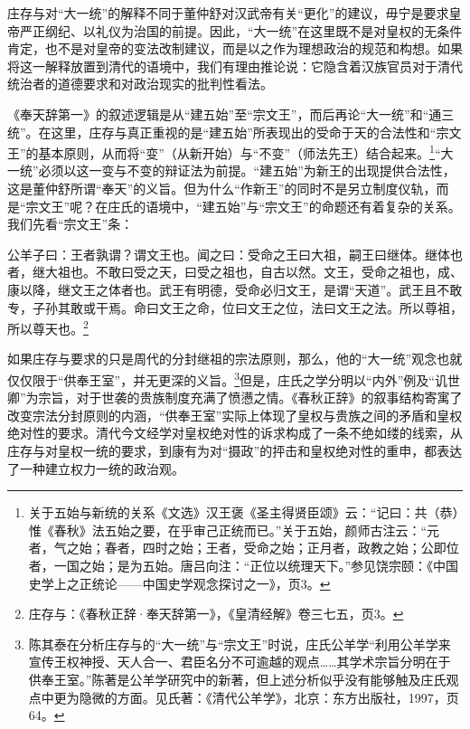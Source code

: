 \documentclass[a4paper, 12pt, openright]{ctexbook}
\renewenvironment{quote}
  {\list{}{\rightmargin2\ccwd \leftmargin2\ccwd \itemindent=2\ccwd \listparindent=2\ccwd}%
   \item\relax\small\kaishu\color{black}}
  {\endlist}
\begin{document}
庄存与对“大一统”的解释不同于董仲舒对汉武帝有关“更化”的建议，毋宁是要求皇帝严正纲纪、以礼仪为治国的前提。因此，“大一统”在这里既不是对皇权的无条件肯定，也不是对皇帝的变法改制建议，而是以之作为理想政治的规范和构想。如果将这一解释放置到清代的语境中，我们有理由推论说：它隐含着汉族官员对于清代统治者的道德要求和对政治现实的批判性看法。

《奉天辞第一》的叙述逻辑是从“建五始”至“宗文王”，而后再论“大一统”和“通三统”。在这里，庄存与真正重视的是“建五始”所表现出的受命于天的合法性和“宗文王”的基本原则，从而将“变”（从新开始）与“不变”（师法先王）结合起来。\footnote{关于五始与新统的关系《文选》汉王褒《圣主得贤臣颂》云：“记曰：共（恭）惟《春秋》法五始之要，在乎审己正统而已。”关于五始，颜师古注云：“元者，气之始；春者，四时之始；王者，受命之始；正月者，政教之始；公即位者，一国之始；是为五始。唐吕向注：“正位以统理天下。”参见饶宗颐：《中国史学上之正统论——中国史学观念探讨之一》，页3。}“大一统”必须以这一变与不变的辩证法为前提。“建五始”为新王的出现提供合法性，这是董仲舒所谓“奉天”的义旨。但为什么“作新王”的同时不是另立制度仪轨，而是“宗文王”呢？在庄氏的语境中，“建五始”与“宗文王”的命题还有着复杂的关系。我们先看“宗文王”条：

\begin{quote}
公羊子曰：王者孰谓？谓文王也。闻之曰：受命之王曰大祖，嗣王曰继体。继体也者，继大祖也。不敢曰受之天，曰受之祖也，自古以然。文王，受命之祖也，成、康以降，继文王之体者也。武王有明德，受命必归文王，是谓“天道”。武王且不敢专，子孙其敢或干焉。命曰文王之命，位曰文王之位，法曰文王之法。所以尊祖，所以尊天也。\footnote{庄存与：《春秋正辞·奉天辞第一》，《皇清经解》卷三七五，页3。}
\end{quote}

如果庄存与要求的只是周代的分封继祖的宗法原则，那么，他的“大一统”观念也就仅仅限于“供奉王室”，并无更深的义旨。\footnote{陈其泰在分析庄存与的“大一统”与“宗文王”时说，庄氏公羊学“利用公羊学来宣传王权神授、天人合一、君臣名分不可逾越的观点……其学术宗旨分明在于供奉王室。”陈著是公羊学研究中的新著，但上述分析似乎没有能够触及庄氏观点中更为隐微的方面。见氏著：《清代公羊学》，北京：东方出版社，1997，页64。}但是，庄氏之学分明以“内外”例及“讥世卿”为宗旨，对于世袭的贵族制度充满了愤懑之情。《春秋正辞》的叙事结构寄寓了改变宗法分封原则的内涵，“供奉王室”实际上体现了皇权与贵族之间的矛盾和皇权绝对性的要求。清代今文经学对皇权绝对性的诉求构成了一条不绝如缕的线索，从庄存与对皇权一统的要求，到康有为对“摄政”的抨击和皇权绝对性的重申，都表达了一种建立权力一统的政治观。
\end{document}
